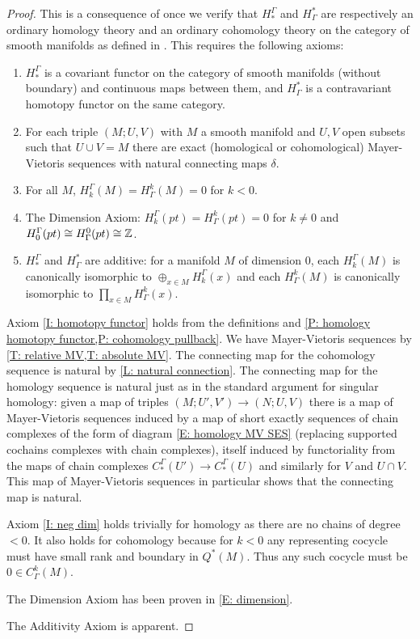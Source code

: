 \begin{proof}
This is a consequence of \cite[Theorem 10]{Krec10b} once we verify that $H_*^\Gamma$ and $H^*_\Gamma$ are respectively an ordinary homology theory and an ordinary cohomology theory on the category of smooth manifolds as defined in \cite{Krec10b}. This requires the following axioms:

\begin{enumerate}
\item \label{I: homotopy functor} $H_*^\Gamma$ is a covariant functor on the category of smooth manifolds (without boundary) and continuous maps between them, and $H^*_\Gamma$ is a contravariant homotopy functor on the same category.

\item For each triple $(M;U,V)$ with $M$ a smooth manifold and $U,V$ open subsets such that $U\cup V=M$ there are exact (homological or cohomological) Mayer-Vietoris sequences with natural connecting maps $\delta$.


\item\label{I: neg dim} For all $M$, $H_k^\Gamma(M)=H^k_\Gamma(M)=0$ for $k<0$.


\item The Dimension Axiom: $H_k^\Gamma(pt)=H^k_\Gamma(pt)=0$ for $k\neq 0$ and $H^\Gamma_0(pt)\cong H_\Gamma^0(pt)\cong \mathbb{Z}$.

\item $H_*^\Gamma$ and $H^*_\Gamma$ are additive: for a manifold $M$ of dimension $0$, each $H_k^\Gamma(M)$ is canonically isomorphic to $\oplus_{x\in M} H_k^\Gamma(x)$ and each $H^k_\Gamma(M)$ is canonically isomorphic to $\prod_{x\in M} H^k_\Gamma(x)$.
\end{enumerate}

Axiom \ref{I: homotopy functor} holds from the definitions and \cref{P: homology homotopy functor,P: cohomology pullback}.
We have Mayer-Vietoris sequences by \cref{T: relative MV,T: absolute MV}. The connecting map for the cohomology sequence is natural by \cref{L: natural connection}. The connecting map for the homology sequence is natural just as in the standard argument for singular homology: given a map of triples $(M;U',V')\to (N;U,V)$ there is a map of Mayer-Vietoris sequences induced by a map of short exactly sequences of chain complexes of the form of diagram \eqref{E: homology MV SES} (replacing supported cochains complexes with chain complexes), itself induced by functoriality from the maps of chain complexes $C_*^{\Gamma}(U')\to C_*^{\Gamma}(U)$ and similarly for $V$ and $U\cap V$. This map of Mayer-Vietoris sequences in particular shows that the connecting map is natural.


Axiom \ref{I: neg dim} holds trivially for homology as there are no chains of degree $<0$. It also holds for cohomology because for $k<0$ any representing cocycle must have small rank and boundary in $Q^*(M)$. Thus any such cocycle must be $0\in C^k_\Gamma(M)$.

The Dimension Axiom has been proven in \cref{E: dimension}.

The Additivity Axiom is apparent.
\end{proof}


